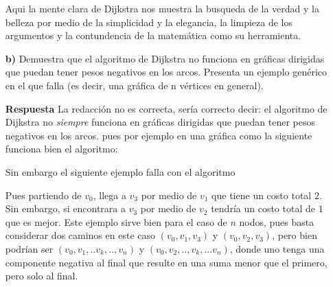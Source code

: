 \documentclass[12pt]{article}
\begin{document}
\begin{itemize}
Aqui la mente clara de Dijkstra nos muestra la busqueda de la verdad y la belleza por medio de la simplicidad y la elegancia, la limpieza de los argumentos y la contundencia de la matemática como su herramienta.

  \item[\bf{b)}]
Demuestra que el algoritmo de Dijkstra no funciona en gráficas dirigidas que puedan
tener pesos negativos en los arcos. Presenta un ejemplo genérico en el que falla (es decir,
una gráfica de n vértices en general).

  \item[\bf{Respuesta}]
La redacción no es correcta, sería correcto decir: el algoritmo de Dijkstra no \emph{siempre} funciona en gráficas dirigidas que puedan tener pesos negativos en los arcos.
pues por ejemplo en una gráfica como la siguiente funciona bien el algoritmo:



Sin embargo el siguiente ejemplo falla con el algoritmo


Pues partiendo de $v_0$, llega a $v_3$ por medio de $v_1$ que tiene un costo total $2$.
Sin embargo, si encontrara a $v_3$  por medio de $v_2$ tendría un costo total de $1$ que es mejor. Este ejemplo sirve bien para el caso de $n$ nodos, pues basta considerar dos caminos en este caso $(v_0,v_1,v_3)$ y $(v_0,v_2,v_3)$, pero bien podrían ser $(v_0,v_1,..v_k,..,v_n)$ y $(v_0,v_2,..,v_k,...v_n)$,  donde uno tenga una componente negativa al final que resulte en una suma menor que el primero, pero solo al final. 

\end{itemize}
\end{document}
